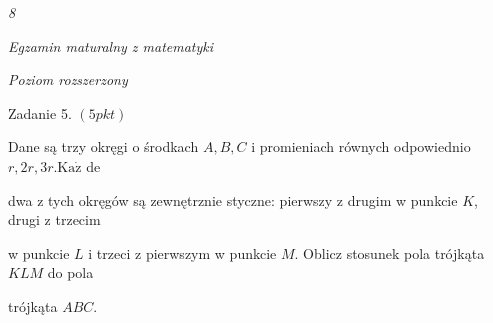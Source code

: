 \documentclass[a4paper,12pt]{article}
\begin{document}
{\it 8}

{\it Egzamin maturalny z matematyki}

{\it Poziom rozszerzony}

Zadanie 5. $(5pkt)$

Dane są trzy okręgi o środkach $A, B, C$ i promieniach równych odpowiednio $r, 2r, 3r. \mathrm{K}\mathrm{a}\dot{\mathrm{z}}$ de

dwa z tych okręgów są zewnętrznie styczne: pierwszy z drugim w punkcie $K$, drugi z trzecim

w punkcie $L$ i trzeci z pierwszym w punkcie $M$. Oblicz stosunek pola trójkąta $KLM$ do pola

trójkąta $ABC.$
\end{document}

